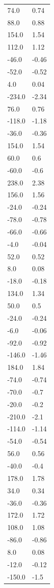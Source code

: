 \begin{longtable}{ll}
74.0 & 0.74 \\
88.0 & 0.88 \\
154.0 & 1.54 \\
112.0 & 1.12 \\
-46.0 & -0.46 \\
-52.0 & -0.52 \\
4.0 & 0.04 \\
-234.0 & -2.34 \\
76.0 & 0.76 \\
-118.0 & -1.18 \\
-36.0 & -0.36 \\
154.0 & 1.54 \\
60.0 & 0.6 \\
-60.0 & -0.6 \\
238.0 & 2.38 \\
156.0 & 1.56 \\
-24.0 & -0.24 \\
-78.0 & -0.78 \\
-66.0 & -0.66 \\
-4.0 & -0.04 \\
52.0 & 0.52 \\
8.0 & 0.08 \\
-18.0 & -0.18 \\
134.0 & 1.34 \\
50.0 & 0.5 \\
-24.0 & -0.24 \\
-6.0 & -0.06 \\
-92.0 & -0.92 \\
-146.0 & -1.46 \\
184.0 & 1.84 \\
-74.0 & -0.74 \\
-70.0 & -0.7 \\
-20.0 & -0.2 \\
-210.0 & -2.1 \\
-114.0 & -1.14 \\
-54.0 & -0.54 \\
56.0 & 0.56 \\
-40.0 & -0.4 \\
178.0 & 1.78 \\
34.0 & 0.34 \\
-36.0 & -0.36 \\
172.0 & 1.72 \\
108.0 & 1.08 \\
-86.0 & -0.86 \\
8.0 & 0.08 \\
-12.0 & -0.12 \\
-150.0 & -1.5 \\

\end{longtable}
